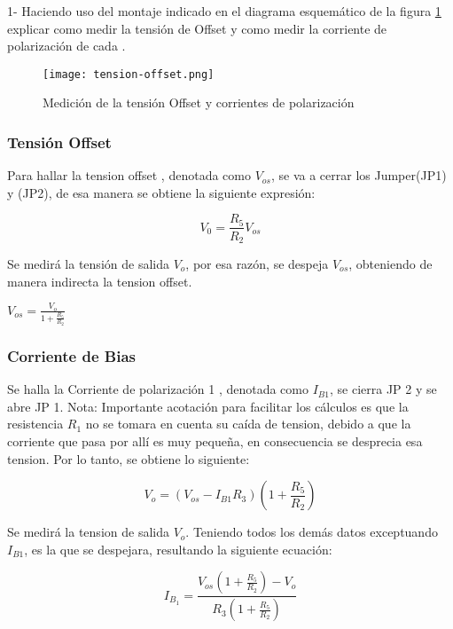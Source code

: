 1- Haciendo uso del montaje indicado en el diagrama esquemático de la figura \ref{fig:offset-y-bias} explicar como medir la tensión de
Offset y como medir la corriente de polarización de cada
.

\begin{figure}[ht]
    \centering
    \texttt{[image: tension-offset.png]}
    \caption{Medición de la tensión Offset y corrientes de polarización}
    \label{fig:offset-y-bias}
\end{figure}

\subsubsection{Tensión Offset}

Para hallar la tension offset  , denotada como $V_{os}$, se va a cerrar los Jumper(JP1) y
(JP2), de esa manera se obtiene la siguiente expresión: 

\begin{equation}
    V_0=\frac{R_5}{R_2}V_{os}
\end{equation}

Se medirá la tensión de salida  $V_o$, por esa razón, se despeja  $V_{os}$, obteniendo de manera indirecta la tension offset.

$V_{os}=\frac{V_o}{1+\frac{R_5}{R_2}}$

\subsubsection{Corriente de Bias}

 Se halla la Corriente de polarización 1 , denotada como $I_{B1}$, se cierra JP 2 y se abre JP 1. Nota: Importante acotación para facilitar los cálculos es que la resistencia  $R_1$ no se tomara en cuenta su caída de tension, debido a que la corriente que pasa por allí es muy pequeña, en consecuencia se desprecia esa tension. Por lo tanto, se obtiene lo siguiente:

 \begin{equation}
    V_o = (V_{os} - I_{B1}R_3)(1 + \frac{R_5}{R_2})
 \end{equation}

 Se medirá la tension de salida  $V_o$. Teniendo todos los demás datos exceptuando $I_{B1}$, es la que se despejara, resultando la siguiente ecuación:


 \begin{equation}
 \boxed{I_{B_1} = \frac{V_{os} \left( 1 + \frac{R_5}{R_2} \right) - V_o}{R_3 \left( 1 + \frac{R_5}{R_2} \right)}}
 \end{equation}

